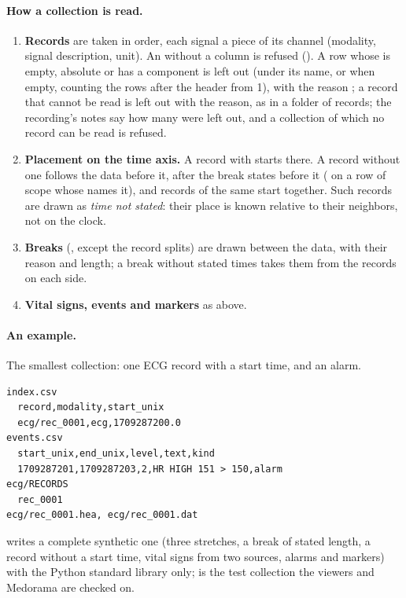 \paragraph{How a collection is read.}
\begin{enumerate}
\item \textbf{Records} are taken in  order, each signal a piece of its channel
  (modality, signal description, unit). An  without a  column is
  refused (). A row whose  is empty, absolute
  or has a  component is left out (under its name, or  when empty, counting
  the rows after the header from 1), with the reason ; a record that cannot be read is left out with the
  reason, as in a folder of records; the recording's notes say how many were left out, and a
  collection of which no record can be read is refused.
\item \textbf{Placement on the time axis.} A record with  starts there. A record
  without one follows the data before it, after the break  states before it
  ( on a row of scope  whose  names it), and records
  of the same  start together. Such records are drawn as \emph{time not stated}:
  their place is known relative to their neighbors, not on the clock.
\item \textbf{Breaks} (, except the record splits) are drawn between the data,
  with their reason and length; a break without stated times takes them from the records on each
  side.
\item \textbf{Vital signs, events and markers} as above.
\end{enumerate}

\paragraph{An example.} The smallest collection: one ECG record with a start time, and an alarm.
\begin{lstlisting}[style=text]
index.csv
  record,modality,start_unix
  ecg/rec_0001,ecg,1709287200.0
events.csv
  start_unix,end_unix,level,text,kind
  1709287201,1709287203,2,HR HIGH 151 > 150,alarm
ecg/RECORDS
  rec_0001
ecg/rec_0001.hea, ecg/rec_0001.dat
\end{lstlisting}
 writes a complete synthetic one (three stretches,
a break of stated length, a record without a start time, vital signs from two sources, alarms and
markers) with the Python standard library only; 
is the test collection the viewers and Medorama are checked on.


